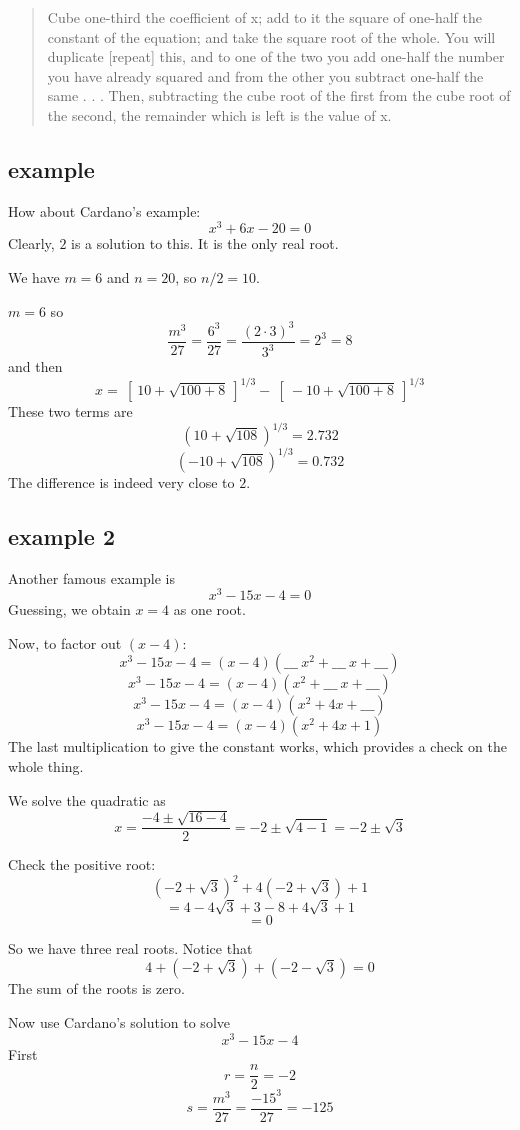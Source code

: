 \documentclass[11pt, oneside]{article}
\begin{document}
\begin{quote}
Cube one-third the coefficient of x; add to it the square of one-half the con­stant of the equation; and take the square root of the whole. You will dupli­cate [repeat] this, and to one of the two you add one-half the number you have already squared and from the other you subtract one-half the same . . . Then, subtracting the cube root of the first from the cube root of the second, the remainder which is left is the value of x.
\end{quote}

\subsection*{example}
How about Cardano's example:
\[ x^3 + 6x - 20 = 0 \]
Clearly, $2$ is a solution to this.  It is the only real root.

We have $m = 6$ and $n = 20$, so $n/2 = 10$.

$m = 6$ so
\[ \frac{m^3}{27} = \frac{6^3}{27} = \frac{(2 \cdot 3)^3}{3^3} = 2^3 = 8  \]
and then
\[ x = \ [ \ 10 + \sqrt{100 + 8} \ ]^{1/3} - \ [ \ -10 + \sqrt{100 + 8} \ ]^{1/3} \]
These two terms are
\[ (10 + \sqrt{108})^{1/3} = 2.732 \]
\[ (-10 + \sqrt{108})^{1/3} = 0.732 \]
The difference is indeed very close to $2$.

\subsection*{example 2}
Another famous example is
\[ x^3 - 15x - 4 = 0 \]
Guessing, we obtain $x = 4$ as one root.

Now, to factor out $(x - 4)$:
\[ x^3 - 15x - 4 = (x - 4) (\_\_\_ \ x^2 + \_\_\_ \ x + \_\_\_ ) \]
\[ x^3 - 15x - 4 = (x - 4) (x^2 + \_\_\_ \ x + \_\_\_ ) \]
\[ x^3 - 15x - 4 = (x - 4) (x^2 + 4x + \_\_\_ ) \]
\[ x^3 - 15x - 4 = (x - 4) (x^2 + 4x + 1 ) \]
The last multiplication to give the constant works, which provides a check on the whole thing.

We solve the quadratic as
\[ x = \frac{-4 \pm \sqrt{16 - 4}}{2} = -2 \pm \sqrt{4 - 1} = -2 \pm \sqrt{3} \]

Check the positive root:
\[ (-2 + \sqrt{3})^2 + 4 (-2 + \sqrt{3}) + 1 \]
\[ = 4 - 4 \sqrt{3} + 3 - 8 + 4 \sqrt{3} + 1 \]
\[ = 0 \]

So we have three real roots.  Notice that
\[ 4 + (-2 + \sqrt{3} ) + (-2 - \sqrt{3} ) = 0 \]
The sum of the roots is zero.

Now use Cardano's solution to solve
\[ x^3 - 15x - 4 \]
First
\[ r = \frac{n}{2} = -2 \]
\[ s = \frac{m^3}{27} =  \frac{-15^3}{27} = -125 \]
\end{document}
